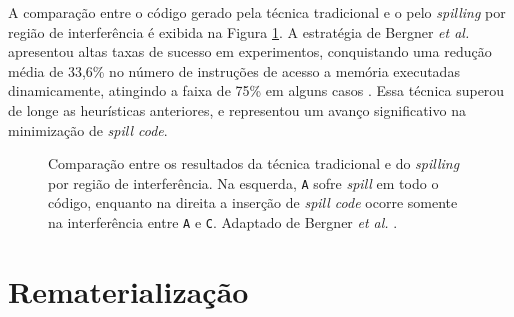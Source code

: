 \documentclass[
	12pt,				%
	openright,			%
	oneside,			%
	a4paper,			%
	tccpreliminar,			%
	]{ABNT-DC-UEL}
\begin{document}
A comparação entre o código gerado pela técnica tradicional e o pelo \textit{spilling} por região de interferência é exibida na Figura \ref{fig:bergner-comparacao}. A estratégia de Bergner \textit{et al.} apresentou altas taxas de sucesso em experimentos, conquistando uma redução média de 33,6\% no número de instruções de acesso a memória executadas dinamicamente, atingindo a faixa de 75\% em alguns casos \cite{bergner:97}. Essa técnica superou de longe as heurísticas anteriores, e representou um avanço significativo na minimização de \textit{spill code}. 

\begin{figure}[H]
    \centering
    \begin{subfigure}{0.49\textwidth}
        \centering
    \end{subfigure}
    \begin{subfigure}{0.49\textwidth}
        \centering
    \end{subfigure}
    \caption{Comparação entre os resultados da técnica tradicional e do \textit{spilling} por região de interferência. Na esquerda, \texttt{A} sofre \textit{spill} em todo o código, enquanto na direita a inserção de \textit{spill code} ocorre somente na interferência entre \texttt{A} e \texttt{C}. Adaptado de Bergner \textit{et al.} \cite{bergner:97}.}
    \label{fig:bergner-comparacao}
\end{figure}

\section{Rematerialização}
\end{document}
